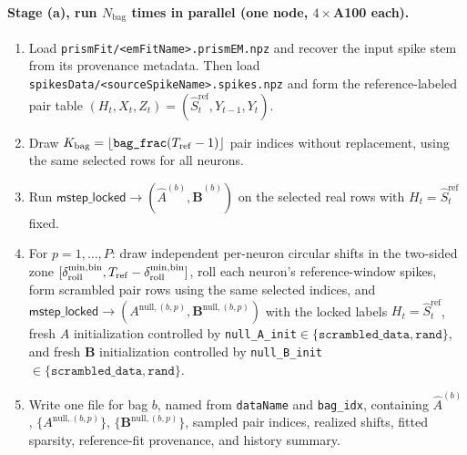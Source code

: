 \documentclass[11pt]{article}
\begin{document}
\paragraph{Stage (a), run \(N_{\text{bag}}\) times in parallel (one node,
\(4\times\)A100 each).}
\begin{enumerate}
  \item Load \texttt{prismFit/<emFitName>.prismEM.npz} and
  recover the input spike stem from its provenance metadata. Then load
  \texttt{spikesData/<sourceSpikeName>.spikes.npz} and form the
  reference-labeled pair table
  \((H_t,X_t,Z_t)=(\hat S^{\text{ref}}_t,Y_{t-1},Y_t)\).
  \item Draw \(K_{\rm bag}=\lfloor\texttt{bag\_frac}(T_{\rm ref}-1)\rfloor\)
  pair indices without replacement, using the same selected rows for all
  neurons.
  \item Run
  \(\textsf{mstep\_locked}\to(\hat A^{(b)},\hat{\mathbf B}^{(b)})\) on the
  selected real rows with \(H_t=\hat S^{\text{ref}}_t\) fixed.
  \item For \(p=1,\dots,P\): draw independent per-neuron circular shifts in
  the two-sided zone
  \([\delta_{\text{roll}}^{\min,\text{bin}},T_{\rm ref}-\delta_{\text{roll}}^{\min,\text{bin}}]\),
  roll each neuron's reference-window spikes, form scrambled pair rows using
  the same selected indices, and
  \(\textsf{mstep\_locked}\to(A^{\text{null},(b,p)},\mathbf B^{\text{null},(b,p)})\)
  with the locked labels \(H_t=\hat S^{\text{ref}}_t\), fresh \(A\)
  initialization controlled by
  \texttt{null\_A\_init}\(\in\{\texttt{scrambled\_data},\texttt{rand}\}\),
  and fresh \(\mathbf B\) initialization controlled by
  \texttt{null\_B\_init}\(\in\{\texttt{scrambled\_data},\texttt{rand}\}\).
  \item Write one file for bag \(b\), named from \texttt{dataName} and
  \texttt{bag\_idx}, containing \(\hat A^{(b)}\),
  \(\{A^{\text{null},(b,p)}\}\), \(\{\mathbf B^{\text{null},(b,p)}\}\),
  sampled pair indices, realized shifts, fitted sparsity, reference-fit
  provenance, and history summary.
\end{enumerate}
\end{document}
